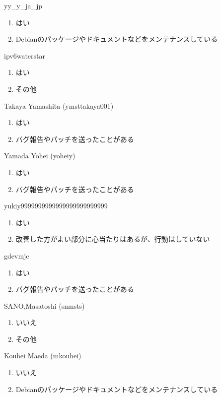 \begin{prework}{ yy\_y\_ja\_jp }
  \begin{enumerate}
  \item はい
  \item Debianのパッケージやドキュメントなどをメンテナンスしている
  \end{enumerate}
\end{prework}

\begin{prework}{ ipv6waterstar }
  \begin{enumerate}
  \item はい
  \item その他
  \end{enumerate}
\end{prework}

\begin{prework}{ Takaya Yamashita (ymsttakaya001) }
  \begin{enumerate}
  \item はい
  \item バグ報告やパッチを送ったことがある
  \end{enumerate}
\end{prework}

\begin{prework}{ Yamada Yohei (yoheiy) }
  \begin{enumerate}
  \item はい
  \item バグ報告やパッチを送ったことがある
  \end{enumerate}
\end{prework}

\begin{prework}{ yukiy9999999999999999999999999 }
  \begin{enumerate}
  \item はい
  \item 改善した方がよい部分に心当たりはあるが、行動はしていない
  \end{enumerate}
\end{prework}

\begin{prework}{ gdevmjc }
  \begin{enumerate}
  \item はい
  \item バグ報告やパッチを送ったことがある
  \end{enumerate}
\end{prework}

\begin{prework}{ SANO,Masatoshi (snmsts) }
  \begin{enumerate}
  \item いいえ
  \item その他
  \end{enumerate}
\end{prework}

\begin{prework}{ Kouhei Maeda (mkouhei) }
  \begin{enumerate}
  \item いいえ
  \item Debianのパッケージやドキュメントなどをメンテナンスしている
  \end{enumerate}
\end{prework}
